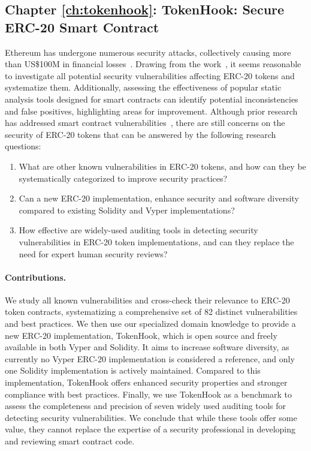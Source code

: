 \subsection{Chapter \ref{ch:tokenhook}: TokenHook: Secure ERC-20 Smart Contract}
Ethereum has undergone numerous security attacks, collectively causing more than US\$100M in financial losses~\cite{DAO1,PeckShield,PartiyMultiSig,MyEthWallet,ParityFirstHack,ParitySecondHack}. Drawing from the \mwa work~\cite{MultipleWithdrawal}, it seems reasonable to investigate all potential security vulnerabilities affecting ERC-20 tokens and systematize them. Additionally, assessing the effectiveness of popular static analysis tools designed for smart contracts can identify potential inconsistencies and false positives, highlighting areas for improvement. Although prior research has addressed smart contract vulnerabilities~\cite{EthSecServ}, there are still concerns on the security of ERC-20 tokens that can be answered by the following research questions:
\begin{enumerate}[label={(RQ4.\arabic*)},leftmargin=*]
	\item What are other known vulnerabilities in ERC-20 tokens, and how can they be systematically categorized to improve security practices?
	\item Can a new ERC-20 implementation, enhance security and software diversity compared to existing Solidity and Vyper implementations?
	\item How effective are widely-used auditing tools in detecting security vulnerabilities in ERC-20 token implementations, and can they replace the need for expert human security reviews?
\end{enumerate}
\paragraph{Contributions.} We study all known vulnerabilities and cross-check their relevance to ERC-20 token contracts, systematizing a comprehensive set of 82 distinct vulnerabilities and best practices. We then use our specialized domain knowledge to provide a new ERC-20 implementation, TokenHook, which is open source and freely available in both Vyper and Solidity. It aims to increase software diversity, as currently no Vyper ERC-20 implementation is considered a reference, and only one Solidity implementation is actively maintained. Compared to this implementation, TokenHook offers enhanced security properties and stronger compliance with best practices. Finally, we use TokenHook as a benchmark to assess the completeness and precision of seven widely used auditing tools for detecting security vulnerabilities. We conclude that while these tools offer some value, they cannot replace the expertise of a security professional in developing and reviewing smart contract code.


